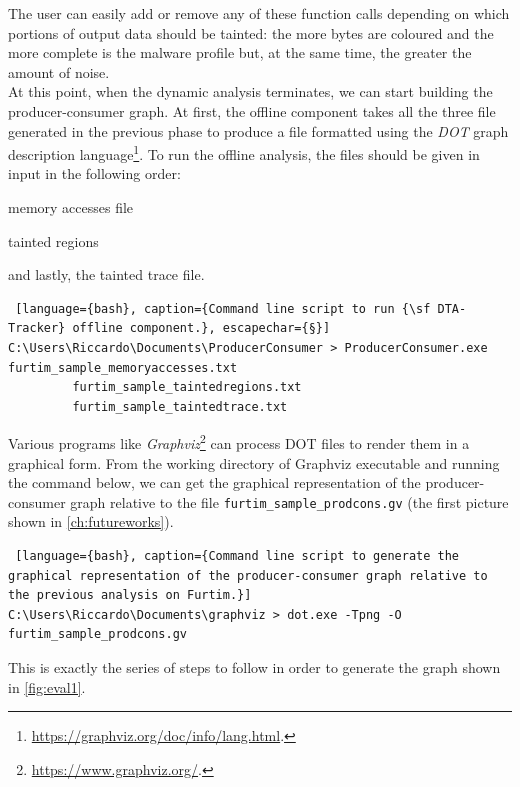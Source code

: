 \documentclass[LaM,binding=0.6cm]{sapthesis}
\begin{document}
The user can easily add or remove any of these function calls depending on which portions of output data should be tainted: the more bytes are coloured and the more complete is the malware profile but, at the same time, the greater the amount of noise.\\

At this point, when the dynamic analysis terminates, we can start building the producer-consumer graph. At first, the offline component takes all the three file generated in the previous phase to produce a file formatted using the \textit{DOT} graph description language\footnote{\url{https://graphviz.org/doc/info/lang.html}.}. To run the offline analysis, the files should be given in input in the following order:
\begin{enumerate*}[label=\roman*),itemjoin={,\quad}]
\item memory accesses file
\item tainted regions 
\item and lastly, the tainted trace file.\\
\end{enumerate*}
\begin{lstlisting} [language={bash}, caption={Command line script to run {\sf DTA-Tracker} offline component.}, escapechar={§}]
C:\Users\Riccardo\Documents\ProducerConsumer > ProducerConsumer.exe furtim_sample_memoryaccesses.txt 
		 furtim_sample_taintedregions.txt 
		 furtim_sample_taintedtrace.txt
\end{lstlisting}
Various programs like \textit{Graphviz}\footnote{\url{https://www.graphviz.org/}.} can process DOT files to render them in a graphical form. From the working directory of Graphviz executable and running the command below, we can get the graphical representation of the producer-consumer graph relative to the file \texttt{furtim\_sample\_prodcons.gv} (the first picture shown in \autoref{ch:futureworks}).
\begin{lstlisting} [language={bash}, caption={Command line script to generate the graphical representation of the producer-consumer graph relative to the previous analysis on Furtim.}]
C:\Users\Riccardo\Documents\graphviz > dot.exe -Tpng -O furtim_sample_prodcons.gv
\end{lstlisting}
This is exactly the series of steps to follow in order to generate the graph shown in \autoref{fig:eval1}.\\ 
\end{document}
